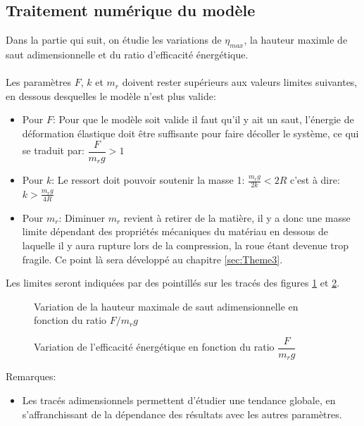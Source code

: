\subsection{Traitement numérique du modèle}
Dans la partie qui suit, on étudie les variations de $\eta_{max}$, la hauteur maximle de saut adimensionnelle et du ratio d'efficacité énergétique.
\\ 
\\ 
Les paramètres $F$, $k$ et $m_r$ doivent rester supérieurs aux valeurs limites suivantes, en dessous desquelles le modèle n'est plus valide:
\begin{itemize}
    \item Pour $F$: Pour que le modèle soit valide il faut qu’il y ait un saut, l'énergie de déformation élastique doit être suffisante pour faire décoller le système, ce qui se traduit par: $\dfrac{F}{m_r g}>1$
    \item Pour $k$: Le ressort doit pouvoir soutenir la masse 1: $\frac{m_r g}{2k}<2R$ c'est à dire: $k>\frac{m_r g}{4R}$ 
    \item Pour $m_r$: Diminuer $m_r$ revient à retirer de la matière, il y a donc une masse limite dépendant des propriétés mécaniques du matériau en dessous de laquelle il y aura rupture lors de la compression, la roue étant devenue trop fragile. Ce point là sera développé au chapitre \ref{sec:Theme3}.
\end{itemize}
Les limites seront indiquées par des pointillés sur les tracés des figures \ref{fig:eta} et \ref{fig:effe}.
\\

\begin{figure}[htb]
\centering
\def\svgwidth{320}

\caption{Variation de la hauteur maximale de saut adimensionnelle en fonction du ratio $F/m_r g$}
\label{fig:eta}
\end{figure}


\begin{figure}[htb]
\centering
\def\svgwidth{320}

\caption{Variation de l'efficacité énergétique en fonction du ratio $\dfrac{F}{m_r g}$}
\label{fig:effe}
\end{figure}


Remarques:
\begin{itemize}
    \item Les tracés adimensionnels permettent d'étudier une tendance globale, en s'affranchissant de la dépendance des résultats avec les autres paramètres.
    
\end{itemize}


